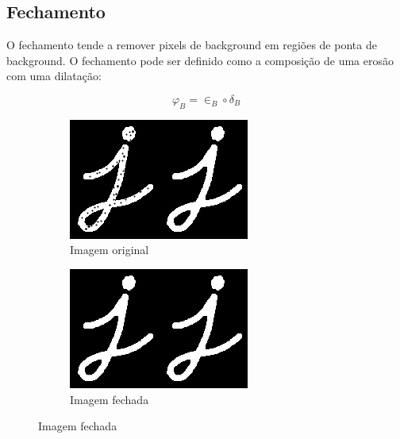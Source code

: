 \documentclass[10pt,a4paper]{article}
\begin{document}
\subsection{Fechamento}
O fechamento tende a remover pixels de background em regiões de ponta de background. O fechamento pode ser definido como a composição de uma erosão com uma dilatação:

\begin{equation}
    \varphi_B = \in_B \circ \delta_B
\end{equation}

\begin{figure}[!ht]
    \centering
    \begin{subfigure}[ht]{0.45\textwidth}
        \includegraphics[width=\textwidth]{src.jpg}
        \caption{Imagem original}
    \end{subfigure}
    \qquad
    \begin{subfigure}[ht]{0.45\textwidth}
        \includegraphics[width=\textwidth]{closing.jpg}
        \caption{Imagem fechada}
    \end{subfigure}
    \label{fig:closing}
\end{figure}
\end{document}
